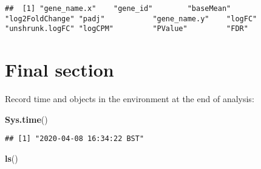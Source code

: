 \documentclass[]{book}
\newenvironment{Shaded}{\begin{snugshade}}{\end{snugshade}}
\newcommand{\KeywordTok}[1]{\textcolor[rgb]{0.13,0.29,0.53}{\textbf{#1}}}
\newcommand{\DataTypeTok}[1]{\textcolor[rgb]{0.13,0.29,0.53}{#1}}
\newcommand{\CharTok}[1]{\textcolor[rgb]{0.31,0.60,0.02}{#1}}
\newcommand{\StringTok}[1]{\textcolor[rgb]{0.31,0.60,0.02}{#1}}
\newcommand{\CommentTok}[1]{\textcolor[rgb]{0.56,0.35,0.01}{\textit{#1}}}
\newcommand{\OperatorTok}[1]{\textcolor[rgb]{0.81,0.36,0.00}{\textbf{#1}}}
\newcommand{\NormalTok}[1]{#1}
\begin{document}
\begin{verbatim}
##  [1] "gene_name.x"    "gene_id"        "baseMean"       "log2FoldChange" "padj"           "gene_name.y"    "logFC"          "unshrunk.logFC" "logCPM"         "PValue"         "FDR"
\end{verbatim}

\begin{Shaded}
\end{Shaded}

\chapter{Final section}\label{final-section}

Record time and objects in the environment at the end of analysis:

\begin{Shaded}
\begin{Highlighting}[]
\KeywordTok{Sys.time}\NormalTok{()}
\end{Highlighting}
\end{Shaded}

\begin{verbatim}
## [1] "2020-04-08 16:34:22 BST"
\end{verbatim}

\begin{Shaded}
\begin{Highlighting}[]
\KeywordTok{ls}\NormalTok{()}
\end{Highlighting}
\end{Shaded}
\end{document}
